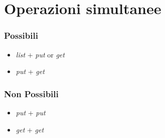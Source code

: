 \documentclass[a4paper, 12pt]{report}
\begin{document}
\section{Operazioni simultanee}
\subsubsection{Possibili}
\begin{itemize}
    \item \emph{list} + \emph{put} or \emph{get}
    \item \emph{put} + \emph{get}
\end{itemize}

\subsubsection{Non Possibili}
\begin{itemize}
    \item \emph{put} + \emph{put}
    \item \emph{get} + \emph{get}
\end{itemize}
\end{document}
